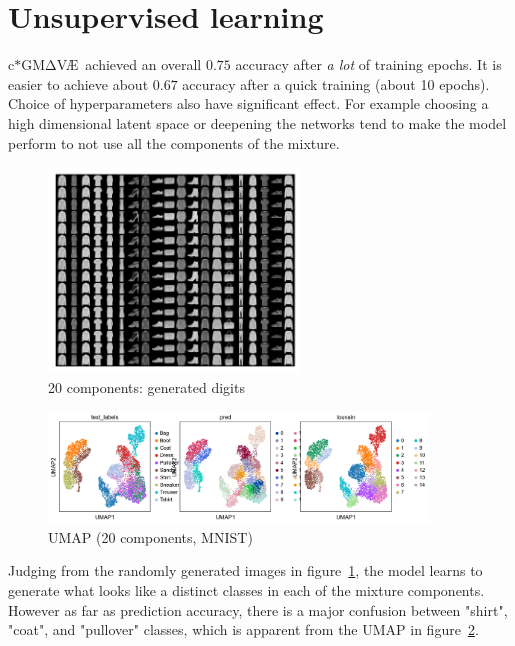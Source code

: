 \documentclass[11pt, a4paper]{report}
\theoremstyle{plain}
\theoremstyle{definition}
\theoremstyle{remark}
\newcommand{\gmvae}{c$\ast$GM$\mathrm{\Delta}$V\AE~}
\begin{document}
\section{Unsupervised learning}

\gmvae achieved an overall $0.75$ accuracy after \emph{a lot} of training epochs.
It is easier to achieve about $0.67$ accuracy after a quick training (about 10
epochs).
Choice of hyperparameters also have significant effect. For example choosing 
a high dimensional latent space or deepening the networks tend to make the model
perform to not use all the components of the mixture.

\begin{figure}[h]
\centering
\includegraphics[width=0.6\textwidth]{images/gmmvae_fmnist_us_20c_samples0.png}
\caption{20 components: generated digits}
\label{fig:fmnist_us_20c_samples}
\end{figure}

\begin{figure}[h]
\centering
\includegraphics[width=0.9\textwidth]{images/gmmvae_fmnist_us_20c_umap0.png}
\caption{UMAP (20 components, MNIST)}
\label{fig:fmnist_us_20c_latent}
\end{figure}

Judging from the randomly generated images in
figure~\ref{fig:fmnist_us_20c_samples}, the model learns to 
generate what looks like a distinct classes in each of the mixture components.
However as far as prediction accuracy, there is a major confusion between
"shirt", "coat", and "pullover" classes, which is apparent from the UMAP in 
figure~\ref{fig:fmnist_us_20c_latent}.
\end{document}
